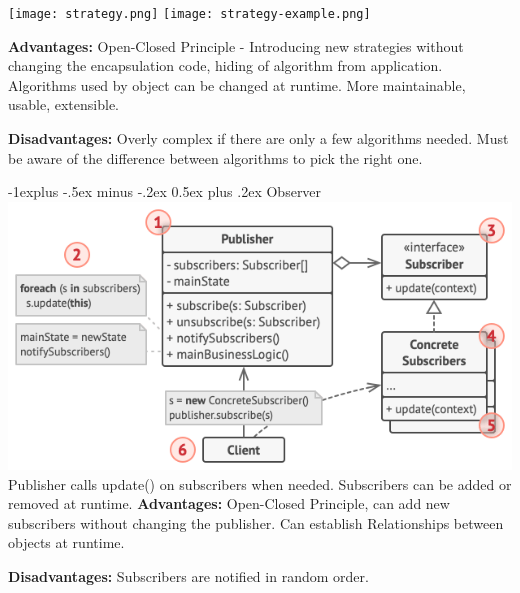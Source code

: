 \documentclass[letterpaper, 8pt]{extarticle}
\makeatletter
\renewcommand{\subsection}{\@startsection{subsection}{2}{0mm}%
                                {-1explus -.5ex minus -.2ex}%
                                {0.5ex plus .2ex}%
                                {\normalfont\small\bfseries}}
\makeatother
\begin{document}
\begin{multicols*}{6}
\begin{enumerate}
\begin{lstlisting}[language=Java, breaklines=true]
        \end{lstlisting}
  \end{enumerate}
  \begin{center}
    \texttt{[image: strategy.png]}
    \texttt{[image: strategy-example.png]}
  \end{center}

  \textbf{Advantages:}
  Open-Closed Principle - Introducing new strategies without changing the encapsulation code,
  hiding of algorithm from application.
  Algorithms used by object can be changed at runtime.
  More maintainable, usable, extensible.

  \textbf{Disadvantages:}
  Overly complex if there are only a few algorithms needed.
  Must be aware of the difference between algorithms to pick the right one.

  \subsection{Observer}
  \includegraphics[width=\linewidth]{observer.png}
  Publisher calls update() on subscribers when needed. Subscribers can be added or removed at runtime.
  \textbf{Advantages:} Open-Closed Principle, can add new subscribers without changing the publisher.
  Can establish Relationships between objects at runtime.

  \textbf{Disadvantages:} Subscribers are notified in random order.


\end{multicols*}
\end{document}

